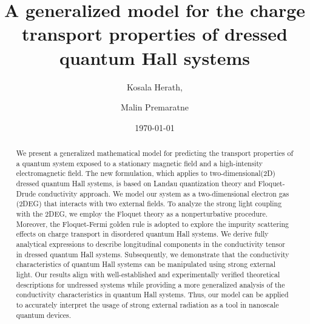 \documentclass[
 reprint,
 amsmath,amssymb,
 aps,
 prb,
]{revtex4-2}
\begin{document}

\title{A generalized model for the charge transport properties of dressed quantum Hall systems}

\author{Kosala Herath,}
\author{Malin Premaratne}

\date{\today}

\begin{abstract}
We present a generalized mathematical model for predicting the transport properties of a quantum system exposed to a stationary magnetic field and a high-intensity electromagnetic field.
The new formulation, which applies to two-dimensional(2D) dressed quantum Hall systems, is based on Landau quantization theory and Floquet-Drude conductivity approach.
We model our system as a two-dimensional electron gas (2DEG) that interacts with two external fields. To analyze the strong light coupling with the 2DEG, we employ the Floquet theory as a nonperturbative procedure.
Moreover, the Floquet-Fermi golden rule is adopted to explore the impurity scattering effects on charge transport in disordered quantum Hall systems.
We derive fully analytical expressions to describe longitudinal components in the conductivity tensor in dressed quantum Hall systems.
Subsequently, we demonstrate that the conductivity characteristics of quantum Hall systems can be manipulated using strong external light.
Our results align with well-established and experimentally
verified theoretical descriptions for undressed systems while providing a more generalized analysis of the conductivity characteristics in quantum Hall systems.
Thus, our model can be applied to accurately interpret the usage of strong external radiation as a tool in nanoscale quantum devices.
\end{abstract}
\end{document}
